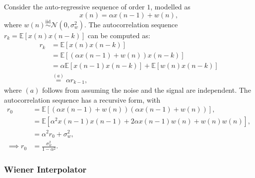 \documentclass[11pt]{article}
\newcommand{\Ex}{\mathbb{E}}
\begin{document}
Consider the auto-regressive sequence of order $1$, modelled as
\begin{equation}
	x(n) = \alpha x(n-1) + w(n),
\end{equation}
where $w(n) \overset{\text{iid}}{\sim} \mathcal{N}(0, \sigma_{w}^{2})$. The autocorrelation sequence $r_{k} = \Ex[x(n) x(n-k)]$ can be computed as:
\begin{equation}
\begin{split}
	r_{k} &= \Ex[x(n) x(n-k)] \\
	&= \Ex \left[ (\alpha x(n-1) + w(n)) x(n-k) \right] \\
	&= \alpha \Ex \left[ x(n-1) x(n-k) \right] + \Ex \left[ w(n) x(n-k) \right] \\
	& \overset{(a)}{=} \alpha r_{k-1},
\end{split}
\end{equation}
where $(a)$ follows from assuming the noise and the signal are independent. The autocorrelation sequence has a recursive form, with
\begin{equation}
\begin{split}
	r_{0} &= \Ex \left[ (\alpha x(n-1) + w(n)) (\alpha x(n-1) + w(n)) \right], \\
	&= \Ex \left[ \alpha^{2} x(n-1) x(n-1) + 2\alpha x(n-1) w(n) + w(n) w(n) \right], \\
	&= \alpha^{2} r_{0} + \sigma_{w}^{2}, \\
	\implies r_{0} &= \frac{\sigma_{w}^{2}}{1-\alpha^{2}}.
\end{split}
\end{equation}


\subsubsection*{Wiener Interpolator}
\label{subsubsec:wiener}
\end{document}
